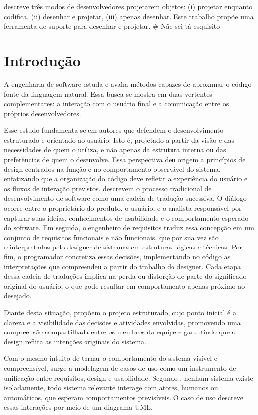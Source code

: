 \documentclass[12pt,a4paper]{article}
\begin{document}
\textcite{larman2002applying} descreve três modos de desenvolvedores projetarem objetos: (i) projetar enquanto codifica, (ii) desenhar e projetar, (iii) apenas desenhar. Este trabalho propõe uma ferramenta de suporte para desenhar e projetar. # Não sei tá esquisito 

\section{Introdução}

A engenharia de software estuda e avalia métodos capazes de aproximar o código fonte da linguagem natural. Essa busca se mostra em duas vertentes complementares: a interação com o usuário final e a comunicação entre os próprios desenvolvedores. 

Esse estudo fundamenta-se em autores que defendem o desenvolvimento estruturado e orientado ao usuário. Isto é, projetado a partir da visão e das necessidades de quem o utiliza, e não apenas da estrutura interna ou das preferências de quem o desenvolve. Essa perspectiva deu origem a princípios de design centrados na função e no comportamento observável do sistema, enfatizando que a organização do código deve refletir a experiência do usuário e os fluxos de interação previstos. \textcite{yourdon1979structured} descrevem o processo tradicional de desenvolvimento de software como uma cadeia de tradução sucessiva. O diálogo ocorre entre o proprietário do produto, o usuário, e o analista responsável por capturar suas ideias, conhecimentos de usabilidade e o comportamento esperado do software. Em seguida, o engenheiro de requisitos traduz essa concepção em um conjunto de requisitos funcionais e não funcionais, que por sua vez são reinterpretados pelo designer de sistemas em estruturas lógicas e técnicas. Por fim, o programador concretiza essas decisões, implementando no código as interpretações que compreendeu a partir do trabalho do designer. Cada etapa dessa cadeia de traduções implica na perda ou distorção de parte do significado original do usuário, o que pode resultar em comportamento apenas próximo ao desejado.

Diante desta situação, \textcite{yourdon1979structured} propõem o projeto estruturado, cujo ponto inicial é a clareza e a visibilidade das decisões e atividades envolvidas, promovendo uma compreensão compartilhada entre os membros da equipe e garantindo que o design reflita as intenções originais do sistema.

Com o mesmo intuito de tornar o comportamento do sistema visível e compreensível, surge a modelagem de casos de uso como um instrumento de unificação entre requisitos, design e usabilidade. Segundo \textcite{booch1999unified}, nenhum sistema existe isoladamente, todo sistema relevante interage com atores, humanos ou automáticos, que esperam comportamentos previsíveis. O caso de uso descreve essas interações por meio de um diagrama UML.
\end{document}
